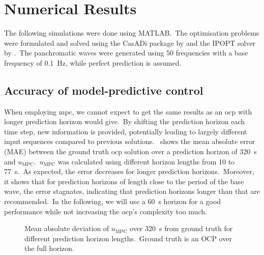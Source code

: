 \section{Numerical Results}

The following simulations were done using MATLAB.\ 
The optimisation problems were formulated and solved using the CasADi package by \cite{Andersson2019casadi} and the IPOPT solver by \cite{Waechter2006ipopt}.\
The panchromatic waves were generated using 50 frequencies with a base frequency of \SI{0.1}{\hertz}, while perfect prediction is assumed.\ 

\subsection{Accuracy of model-predictive control}
\label{sec:accuracy}
When employing \ac{mpc}, we cannot expect to get the same results as an \ac{ocp} with longer prediction horizon would give.\ 
By shifting the prediction horizon each time step, new information is provided, potentially leading to largely different input sequences compared to previous solutions.\
 shows the mean absolute error (MAE) between the ground truth \ac{ocp} solution over a prediction horizon of \SI{320}{\second} and $u_\mathrm{MPC}$.\ 
$u_\mathrm{MPC}$ was calculated using different horizon lengths from 10 to \SI{77}{\second}.\
As expected, the error decreases for longer prediction horizons.\ 
Moreover, it shows that for prediction horizons of length close to the period of the base wave, the error stagnates, indicating that prediction horizons longer than that are recommended.\ 
In the following, we will use a \SI{60}{\second} horizon for a good performance while not increasing the \ac{ocp}'s complexity too much.
\begin{figure}[htb]
	\centering
	\fontsize{8}{0}\selectfont
	\def\svgwidth{0.47\textwidth}
	
	\caption{Mean absolute deviation of $u_\mathrm{MPC}$ over \SI{320}{\second} from ground truth for different prediction horizon lengths.\ Ground truth is an OCP over the full horizon.}
	\label{fig:mpc_error}
\end{figure}

